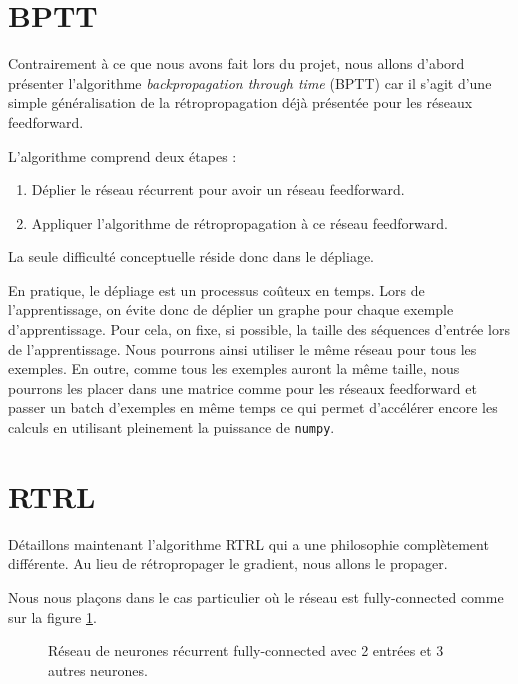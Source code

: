 \section{BPTT}

Contrairement à ce que nous avons fait lors du projet, nous allons d'abord présenter l'algorithme \textit{backpropagation through time} (BPTT) car il s'agit d'une simple généralisation de la rétropropagation déjà présentée pour les réseaux feedforward.

L'algorithme comprend deux étapes :
\begin{enumerate}
\item Déplier le réseau récurrent pour avoir un réseau feedforward.
\item Appliquer l'algorithme de rétropropagation à ce réseau feedforward.
\end{enumerate}

La seule difficulté conceptuelle réside donc dans le dépliage.

En pratique, le dépliage est un processus coûteux en temps. Lors de l'apprentissage, on évite donc de déplier un graphe pour chaque exemple d'apprentissage. Pour cela, on fixe, si possible, la taille des séquences d'entrée lors de l'apprentissage. Nous pourrons ainsi utiliser le même réseau pour tous les exemples. En outre, comme tous les exemples auront la même taille, nous pourrons les placer dans une matrice comme pour les réseaux feedforward et passer un batch d'exemples en même temps ce qui permet d'accélérer encore les calculs en utilisant pleinement la puissance de \texttt{numpy}.

\section{RTRL}

\label{RTRL_section}

Détaillons maintenant l'algorithme RTRL qui a une philosophie complètement différente. Au lieu de rétropropager le gradient, nous allons le propager.

Nous nous plaçons dans le cas particulier où le réseau est fully-connected comme sur la figure \ref{fully_connected_recurrent_network}. 

\begin{figure}
\begin{center}

\caption{Réseau de neurones récurrent fully-connected avec 2 entrées et 3 autres neurones.}
\label{fully_connected_recurrent_network}
\end{center}
\end{figure}

